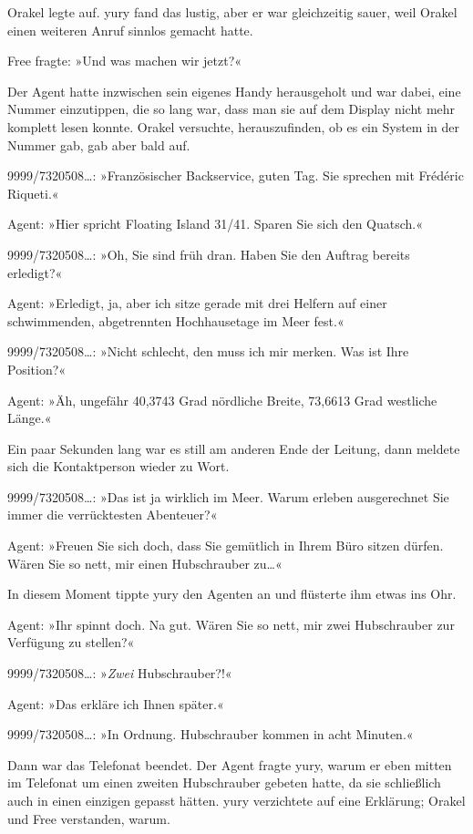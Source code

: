 Orakel legte auf. yury fand das lustig, aber er war gleichzeitig sauer, weil Orakel einen weiteren Anruf sinnlos gemacht hatte.

Free fragte: »Und was machen wir jetzt?«

Der Agent hatte inzwischen sein eigenes Handy herausgeholt und war dabei, eine Nummer einzutippen, die so lang war, dass man sie auf dem Display nicht mehr komplett lesen konnte. Orakel versuchte, herauszufinden, ob es ein System in der Nummer gab, gab aber bald auf.

9999/7320508…: »Französischer Backservice, guten Tag. Sie sprechen mit Frédéric Riqueti.«

Agent: »Hier spricht Floating Island 31/41. Sparen Sie sich den Quatsch.«

9999/7320508…: »Oh, Sie sind früh dran. Haben Sie den Auftrag bereits erledigt?«

Agent: »Erledigt, ja, aber ich sitze gerade mit drei Helfern auf einer schwimmenden, abgetrennten Hochhausetage im Meer fest.«

9999/7320508…: »Nicht schlecht, den muss ich mir merken. Was ist Ihre Position?«

Agent: »Äh, ungefähr 40,3743 Grad nördliche Breite, 73,6613 Grad westliche Länge.«

Ein paar Sekunden lang war es still am anderen Ende der Leitung, dann meldete sich die Kontaktperson wieder zu Wort.

9999/7320508…: »Das ist ja wirklich im Meer. Warum erleben ausgerechnet Sie immer die verrücktesten Abenteuer?«

Agent: »Freuen Sie sich doch, dass Sie gemütlich in Ihrem Büro sitzen dürfen. Wären Sie so nett, mir einen Hubschrauber zu…«

In diesem Moment tippte yury den Agenten an und flüsterte ihm etwas ins Ohr.

Agent: »Ihr spinnt doch. Na gut. Wären Sie so nett, mir zwei Hubschrauber zur Verfügung zu stellen?«

9999/7320508…: »\emph{Zwei} Hubschrauber?!«

Agent: »Das erkläre ich Ihnen später.«

9999/7320508…: »In Ordnung. Hubschrauber kommen in acht Minuten.«

Dann war das Telefonat beendet. Der Agent fragte yury, warum er eben mitten im Telefonat um einen zweiten Hubschrauber gebeten hatte, da sie schließlich auch in einen einzigen gepasst hätten. yury verzichtete auf eine Erklärung; Orakel und Free verstanden, warum.

